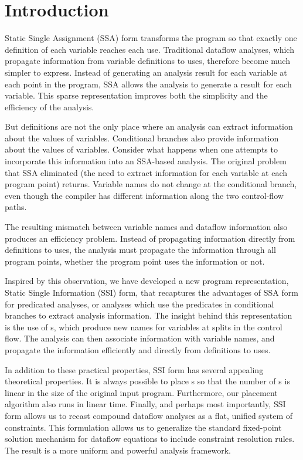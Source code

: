 \section{Introduction}

Static Single Assignment (SSA) form transforms the
program so that exactly one definition of each 
variable reaches each use. Traditional dataflow
analyses, which propagate information from variable
definitions to uses, therefore become much simpler
to express. Instead of generating an analysis 
result for each variable at each point in the
program, SSA allows the analysis to generate a 
result for each variable. This sparse
representation improves both the simplicity
and the efficiency of the analysis. 

But definitions are not the only place where
an analysis can extract information about the
values of variables. Conditional branches also
provide information about the values of variables.
Consider what happens when one attempts to incorporate
this information into an SSA-based analysis. The
original problem that SSA eliminated (the need to
extract information for each variable at each
program point) returns. Variable names do not
change at the conditional branch, even though
the compiler has different information along the
two control-flow paths.

The resulting mismatch between variable names
and dataflow information also produces an efficiency
problem. Instead of propagating information
directly from definitions to uses, the analysis
must propagate the information through all 
program points, whether the program point uses
the information or not. 

Inspired by this observation, we have developed
a new program representation, 
Static Single Information (SSI) form,  that recaptures
the advantages of SSA form for predicated analyses,
or analyses which use the predicates in conditional
branches to extract analysis information.
The insight behind this representation is the use
of \sigfunction{}s, which produce new names
for variables at splits in the control flow.
The analysis can then associate information
with variable names, and propagate
the information efficiently and directly from 
definitions to uses. 

In addition to these practical properties, 
SSI form has several appealing 
theoretical properties. It is always possible 
to place \sigfunction{}s so that the
number of \sigfunction{}s is linear in the size
of the original input program. Furthermore, our
placement algorithm also runs in linear time. 
Finally, and perhaps most importantly, SSI form
allows us to recast compound dataflow analyses as
a flat, unified system of constraints. This
formulation allows us to generalize the standard
fixed-point solution
mechanism for dataflow equations to include 
constraint resolution rules. The result is 
a more uniform and powerful analysis framework.

